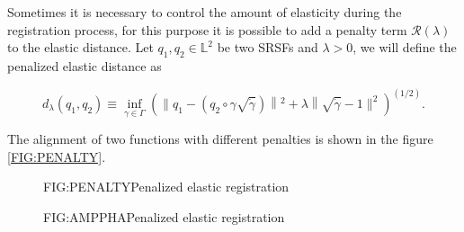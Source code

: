 
Sometimes it is necessary to control the amount of elasticity during the
registration process, for this purpose it is possible to add a penalty term
$\mathcal{R}(\lambda)$ to the elastic distance.
Let $q_1, q_2 \in \mathbb{L}^2$ be two SRSFs and $\lambda > 0$, we will define
the penalized elastic distance as

$$
d_{\lambda}\left(q_{1}, q_{2}\right) \equiv \inf _{\gamma \in \Gamma}\left(
\| q_{1}-\left(q_{2} \circ \gamma \sqrt{\dot{\gamma}}\right)\left\|^{2}+
\lambda\right\| \sqrt{\dot{\gamma}}-1 \|^{2} \right)^{(1 / 2)}.
$$

The alignment of two functions with different penalties is shown in the figure \ref{FIG:PENALTY}.

\begin{figure}[Penalized elastic registration]{FIG:PENALTY}{Penalized elastic registration}
\end{figure}

\begin{figure}[Penalized elastic registration]{FIG:AMPPHA}{Penalized elastic registration}
   \quad
\end{figure}
